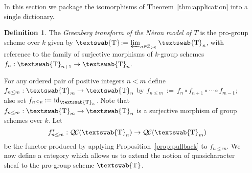\documentclass[11pt]{amsart}
\newcommand{\mathswab}[1]{\operatorname{\textswab{#1}}}
\theoremstyle{plain}
\theoremstyle{definition}
\newtheorem{definition}[theorem]{Definition}
\theoremstyle{remark}
\newcommand{\ZZ}{{\mathbb{Z}}}
\newcommand{\Fq}{k}
\DeclareMathOperator{\id}{id}
\newcommand{\cdef}[1]{{#1}\index{#1}}
\newcommand{\ceq}{{\, :=\, }}
\newcommand{\GN}[1]{\mathswab{#1}}
\newcommand{\QC}{{\mathcal{Q\hskip-0.8pt C}}}
\begin{document}
In this section we package the isomorphisms of Theorem~\ref{thm:application} into
a single dictionary.

\begin{definition}\label{def:objGN}
The \emph{Greenberg transform of the N\'eron model of $T$} 
is the pro-group scheme over $\Fq$ given by 
$\cdef{\GN{T}} \ceq \varprojlim_{n\in \ZZ_{>0}} \GN{T}_{n}$, 
with reference to the family of  surjective morphisms of 
$\Fq$-group schemes $f_n : \GN{T}_{n+1} \to \GN{T}_n$.
\end{definition}

For any  ordered pair of positive integers $n< m$ define 
$f_{n\leq m} : \GN{T}_{m} \to \GN{T}_{n}$ 
by $f_{n\leq m}\ceq f_n \circ f_{n+1} \circ \cdots \circ f_{m-1}$; 
also set $f_{n\leq n} \ceq \id_{\GN{T}_n}$.
Note that $f_{n\leq m}:  \GN{T}_{m} \to \GN{T}_{n}$ is a surjective morphism 
of group schemes over $\Fq$.
Let 
\[
f_{n\leq m}^* : \QC(\GN{T}_n) \to \QC(\GN{T}_{m})
\]
be the functor produced by applying Proposition~\ref{prop:pullback} to $f_{n\leq m}$.
We now define a category which allows us to extend the notion 
of quasicharacter sheaf to the pro-group scheme $\GN{T}$. 
\end{document}
